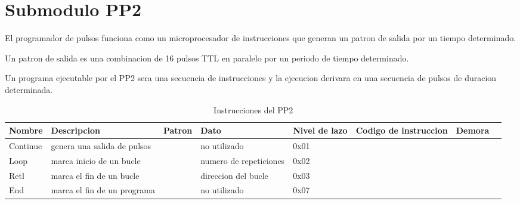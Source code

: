 \section{Submodulo PP2}

El programador de pulsos funciona como un microprocesador de instrucciones que generan
un patron de salida por un tiempo determinado.

Un patron de salida es una combinacion de 16 pulsos TTL en paralelo por un periodo 
de tiempo determinado.

Un programa ejecutable por el PP2 sera una secuencia de instrucciones y la ejecucion
derivara en una secuencia de pulsos de duracion determinada.

\begin{table}[ht]
    \centering
    \begin{tabular}{|l|l|l|l|l|l|l|l|}
    \hline
    Nombre   & Descripcion                   &Patron  & Dato & Nivel de lazo & Codigo de instruccion & Demora \\
    \hline 
    Continue & genera una salida de pulsos   &        &no utilizado         & 0x01                  &        \\
    \hline
    Loop     & marca inicio de un bucle      &        &numero de repeticiones& 0x02                  &        \\
    \hline
    Retl     & marca el fin de un bucle      &        &direccion del bucle   & 0x03                  &        \\
    \hline
    End      & marca el fin de un programa   &        &no utilizado          & 0x07                  &        \\
    \hline
\end{tabular}
\caption{\label{tab:pp2_ins}Instrucciones del PP2}
\end{table}



\newpage
